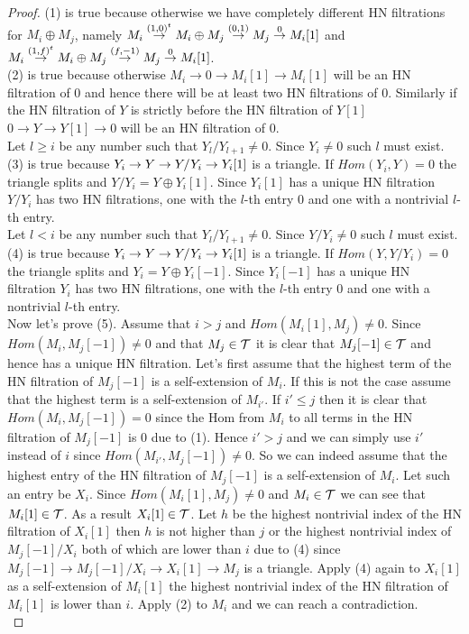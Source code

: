\begin{proof}
\indent (1) is true because otherwise we have completely different HN filtrations for $M_i\oplus M_j$, namely $M_i\overset{(1,0)^t}{\to} M_i\oplus M_j\overset{(0,1)}{\to} M_j\overset{0}{\to} M_i[1]$ and $M_i\overset{(1,f)^t}{\to} M_i\oplus M_j\overset{(f,-1)}{\to} M_j\overset{0}{\to} M_i[1]$.\\
\indent (2) is true because otherwise $M_i\to 0\to M_i[1]\to M_i[1]$ will be an HN filtration of 0 and hence there will be at least two HN filtrations of 0. Similarly if the HN filtration of $Y$ is strictly before the HN filtration of $Y[1]$ $0\to Y\to Y[1]\to 0$ will be an HN filtration of 0.\\
\indent Let $l \geq i$ be any number such that $Y_l/Y_{l+1}\neq 0$. Since $Y_i\neq 0$ such $l$ must exist. (3) is true because $Y_i\to Y\to Y/Y_i\to Y_i[1]$ is a triangle. If $Hom(Y_i,Y)= 0$ the triangle splits and $Y/Y_i = Y\oplus Y_i[1]$. Since $Y_i[1]$ has a unique HN filtration $Y/Y_i$ has two HN filtrations, one with the $l$-th entry 0 and one with a nontrivial $l$-th entry. \\
\indent Let $l < i$ be any number such that $Y_l/Y_{l+1}\neq 0$. Since $Y/Y_i\neq 0$ such $l$ must exist. (4) is true because $Y_i\to Y\to Y/Y_i\to Y_i[1]$ is a triangle. If $Hom(Y,Y/Y_i)= 0$ the triangle splits and $Y_i = Y\oplus Y_i[-1]$. Since $Y_i[-1]$ has a unique HN filtration $Y_i$ has two HN filtrations, one with the $l$-th entry 0 and one with a nontrivial $l$-th entry. \\
\indent Now let's prove (5). Assume that $i>j$ and $Hom(M_i[1],M_j) \neq 0$. Since $Hom(M_i,M_j[-1])\neq 0$ and that $M_j\in\mathcal{T}$ it is clear that $M_j[-1]\in\mathcal{T}$ and hence has a unique HN filtration. Let's first assume that the highest term of the HN filtration of $M_j[-1]$ is a self-extension of $M_i$. If this is not the case assume that the highest term is a self-extension of $M_{i'}$. If $i'\leq j$ then it is clear that $Hom(M_i,M_j[-1])=0$ since the Hom from $M_i$ to all terms in the HN filtration of $M_j[-1]$ is 0 due to (1). Hence $i'>j$ and we can simply use $i'$ instead of $i$ since $Hom(M_{i'},M_j[-1])\neq 0$. So we can indeed assume that the highest entry of the HN filtration of $M_j[-1]$ is a self-extension of $M_i$. Let such an entry be $X_i$. Since $Hom(M_i[1], M_j)\neq 0$ and $M_i\in\mathcal{T}$ we can see that $M_i[1]\in\mathcal{T}$. As a result $X_i[1]\in\mathcal{T}$. Let $h$ be the highest nontrivial index of the HN filtration of $X_i[1]$ then $h$ is not higher than $j$ or the highest nontrivial index of $M_j[-1]/X_i$ both of which are lower than $i$ due to (4) since $M_j[-1]\to M_j[-1]/X_i\to X_i[1]\to M_j$ is a triangle. Apply (4) again to $X_i[1]$ as a self-extension of $M_i[1]$ the highest nontrivial index of the HN filtration of $M_i[1]$ is lower than $i$. Apply (2) to $M_i$ and we can reach a contradiction.\\

\end{proof}
